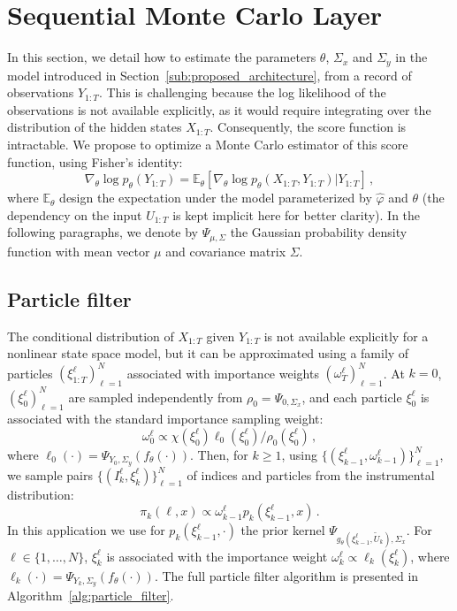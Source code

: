 \documentclass[journal]{IEEEtran}
\begin{document}
\section{Sequential Monte Carlo Layer}%
\label{sub:uncertainty_estimation}
In this section, we detail how to estimate the parameters $\theta$, $\Sigma_x$ and $\Sigma_y$ in the model introduced in Section~\ref{sub:proposed_architecture}, from a record of observations $Y_{1:T}$.
This is challenging because the log likelihood of the observations is not available explicitly, as it would require integrating over the distribution of the hidden states $X_{1:T}$.
Consequently, the score function is intractable.
We propose to optimize a Monte Carlo estimator of this score function, using Fisher's identity:
\begin{equation}
	\nabla_\theta \log p_\theta(Y_{1:T}) = \mathbb{E}_\theta \left[ \nabla_\theta\log p_\theta(X_{1:T}, Y_{1:T}) | Y_{1:T} \right]\,,
	\label{eq:grad_ll}
\end{equation}
where $\mathbb{E}_\theta$ design the expectation under the model parameterized by $\widehat \varphi$ and $\theta$ (the dependency on the input $U_{1:T}$ is kept implicit here for better clarity).
In the following paragraphs, we denote by $\Psi_{\mu, \Sigma}$ the Gaussian probability density function with mean vector $\mu$ and covariance matrix $\Sigma$.

\subsection{Particle filter}
The conditional distribution of $X_{1:T}$ given $Y_{1:T}$ is not available explicitly for a nonlinear state space model, but it can be approximated using a family of particles $(\xi^{\ell}_{1:T})_{\ell=1}^N$ associated with importance weights $(\omega^{\ell}_T)_{\ell=1}^N$.
At $k = 0$, $(\xi^{\ell}_0)_{\ell=1}^N$ are sampled independently from $\rho_0 = \Psi_{0, \Sigma_x}$, and each particle $\xi^{\ell}_0$ is associated with the standard importance sampling weight:
\[
	\omega_0^{\ell} \propto \chi\left(\xi^{\ell}_0\right)\ell_0 \left(\xi^{\ell}_0\right)/ \rho_0 \left(\xi^{\ell}_0\right)\,,
\]
where $\ell_0(\cdot) = \Psi_{Y_0, \Sigma_y}(f_\theta(\cdot))$.
Then, for $k\geq 1$, using $\{(\xi^{\ell}_{k-1},\omega^{\ell}_{k-1})\}_{\ell=1}^N$, we sample pairs $\{(I^{\ell}_k,\xi^{\ell}_{k})\}_{\ell=1}^N$ of indices and particles from the instrumental distribution:
\[
	\pi_{k}(\ell,x) \propto \omega_{k-1}^{\ell} p_k(\xi^{\ell}_{k-1},x)\,.
\]
In this application we use for $p_k(\xi^{\ell}_{k-1},\cdot)$ the prior kernel $\Psi_{g_\theta(\xi^\ell_{k-1}, \tilde U_k), \Sigma_x}$.
For $\ell \in \{1,\ldots,N\}$, $\xi^{\ell}_k$ is associated with the importance weight $\omega^{\ell}_k \propto \ell_k(\xi^{\ell}_k)$, where $\ell_k(\cdot) = \Psi_{Y_k, \Sigma_y}(f_\theta(\cdot))$.
The full particle filter algorithm is presented in Algorithm~\ref{alg:particle_filter}.
\end{document}
